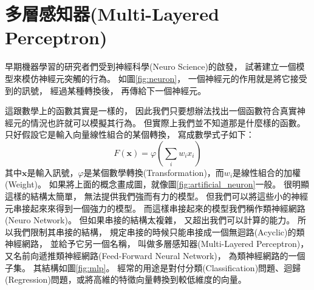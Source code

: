 \section{多層感知器(Multi-Layered Perceptron)}
  早期機器學習的研究者們受到神經科學(Neuro Science)的啟發，
  試著建立一個模型來模仿神經元突觸的行為。
  如圖\ref{fig:neuron}，
  一個神經元的作用就是將它接受到的訊號，
  經過某種轉換後，
  再傳給下一個神經元。
  \begin{figure}
    \centering
  \end{figure}
  這跟數學上的函數其實是一樣的，
  因此我們只要想辦法找出一個函數符合真實神經元的情況也許就可以模擬其行為。
  但實際上我們並不知道那是什麼樣的函數。
  只好假設它是輸入向量線性組合的某個轉換，
  寫成數學式子如下：
  \begin{equation}
    F(\mathbf{x}) = \varphi \left( \sum_i w_i x_i \right)
  \end{equation}
  其中$\mathbf{x}$是輸入訊號，$\varphi$是某個數學轉換(Transformation)，而$w_i$是線性組合的加權(Weight)。
  如果將上面的概念畫成圖，就像圖\ref{fig:artificial_neuron}一般。
  很明顯這樣的結構太簡單，
  無法提供我們強而有力的模型。
  但我們可以將這些小的神經元串接起來來得到一個強力的模型。
  而這樣串接起來的模型我們稱作類神經網路(Neuro Network)。
  但如果串接的結構太複雜，
  又超出我們可以計算的能力。
  所以我們限制其串接的結構，
  規定串接的時候只能串接成一個無迴路(Acyclic)的類神經網路，
  並給予它另一個名稱，
  叫做多層感知器(Multi-Layered Perceptron)，
  又名前向遞推類神經網路(Feed-Forward Neural Network)，
  為類神經網路的一個子集。
  其結構如圖\ref{fig:mlp}。
  經常的用途是對付分類(Classification)問題、迴歸(Regression)問題，或將高維的特徵向量轉換到較低維度的向量。
  \def\layersep{2.5cm}
